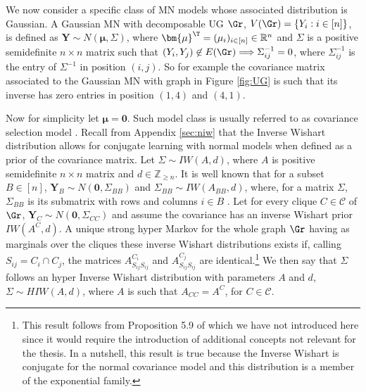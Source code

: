 We now consider a specific class of \gls{MN} models whose associated distribution is Gaussian. A Gaussian \gls{MN} with decomposable \gls{UG} $\Gr$, $V(\Gr)=\{Y_i:i\in[n]\}$, is defined as $\bm{Y}\sim N(\bm{\mu},\Sigma)$, where $\bm{\mu}^\T=(\mu_i)_{i\in[n]}\in\mathbb{R}^n$ and $\Sigma$ is a positive semidefinite $n\times n$ matrix such that $
(Y_i,Y_j)\not\in E(\Gr)\Longrightarrow \Sigma_{ij}^{-1}=0$,
where $\Sigma_{ij}^{-1}$ is the entry of $\Sigma^{-1}$ in position $(i,j)$. So for example the covariance matrix associated to the Gaussian \gls{MN} with graph in Figure \ref{fig:UG} is such that its inverse has zero entries in position $(1,4)$ and $(4,1)$.
\begin{comment}
\begin{equation}
\left(
\begin{array}{cccc}
\sigma_{11}&\sigma_{21}&\sigma_{31}&0\\
\sigma_{21}&\sigma_{22}&\sigma_{32}&\sigma_{42}\\
\sigma_{31}&\sigma_{32}&\sigma_{33}&\sigma_{43}\\
0&\sigma_{42}&\sigma_{43}&\sigma_{44}
\end{array}
\right)^{-1}.
\end{equation}
\end{comment}
Now for simplicity let $\bm{\mu}=\bm{0}$. Such model class is usually referred to as covariance selection model \citep{Wermuth1976}. Recall from Appendix \ref{sec:niw} that the Inverse Wishart distribution allows for conjugate learning with normal models when defined as a prior of the covariance matrix. Let $\Sigma\sim IW(A,d)$, where $A$ is positive semidefinite $n\times n$ matrix and $d\in\mathbb{Z}_{\geq n}$. It is well known that for a subset $B\in[n]$, $\bm{Y}_{B}\sim N(\bm{0},\Sigma_{BB})$ and $\Sigma_{BB}\sim IW(A_{BB},d)$, where, for a matrix $\Sigma$, $\Sigma_{BB}$ is its submatrix with rows and columns $i\in B$ \citep[see e.g.][]{Dawid1993}. Let for every clique $C\in\mathcal{C}$ of $\Gr$, $\bm{Y}_{C}\sim N(\bm{0},\Sigma_{CC})$ and assume the covariance has an inverse Wishart prior $IW(A^C,d)$. A unique strong hyper Markov for the whole graph $\Gr$ having as marginals over the cliques these inverse Wishart distributions exists if, calling $S_{ij}=C_i\cap C_j$, the matrices $A^{C_i}_{S_{ij}S_{ij}}$ and $A^{C_j}_{S_{ij}S_{ij}}$ are identical.\footnote{This result follows from Proposition 5.9 of \citet{Dawid1993} which we have not introduced here since it would require the introduction of additional concepts not relevant for the thesis. In a nutshell, this result is true because the Inverse Wishart is conjugate for the normal covariance model and this distribution is a member of the exponential family.} We then say that $\Sigma$ follows an hyper Inverse Wishart distribution with parameters $A$ and $d$, $\Sigma\sim HIW(A,d)$, where $A$ is such that $A_{CC}=A^C$, for $C\in\mathcal{C}$.  

